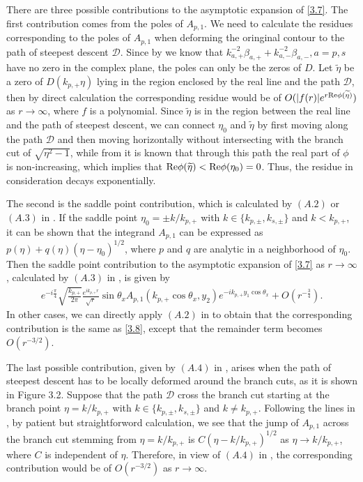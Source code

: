 \documentclass[final,reqno]{siamltex}
\newcommand{\Rt}{{\rm Re}}
\newcommand{\wid}{\widetilde}
\newcommand{\be}{\begin{eqnarray}}
\newcommand{\en}{\end{eqnarray}}
\begin{document}
There are three possible contributions to the asymptotic expansion of \eqref{3.7}. The first contribution comes from the poles of $A_{p,1}$. We need to calculate the residues corresponding to the poles of $A_{p,1}$ when deforming the oringinal contour to the path of steepest descent $\mathcal{D}$. Since by \cite[Section 2.3.4]{CP17} we know that $k_{a,+}^{-2}\beta_{a,+}+k_{a,-}^{-2}\beta_{a,-},a=p,s$ have no zero in the complex plane, the poles can only be the zeros of $D$. Let $\wid\eta$ be a zero of $D(k_{p,+}\eta)$ lying in the region enclosed by the real line and the path $\mathcal{D}$, then by direct calculation the corresponding residue would be of $O(|f(r)|e^{r\Rt\phi(\wid\eta)})$ as $r\rightarrow\infty$, where $f$ is a polynomial. Since $\wid\eta$ is in the region between the real line and the path of steepest descent, we can connect $\eta_0$ and $\wid\eta$ by first moving along the path $\mathcal{D}$ and then moving horizontally without intersecting with the branch cut of $\sqrt{\eta^2-1}$, while from \cite[Section 7.2]{NB84} it is known that through this path the real part of $\phi$ is non-increasing, which implies that $\Rt\phi(\wid\eta)<\Rt\phi(\eta_0)=0$. Thus, the residue in consideration decays exponentially. 

The second is the saddle point contribution, which is calculated by $(A.2)$ or $(A.3)$ in \cite{CP17}. If the saddle point $\eta_0=\pm k/k_{p,+}$ with $k\in\{k_{p,\pm},k_{s,\pm}\}$ and $k<k_{p,+}$, it can be shown that the integrand $A_{p,1}$ can be expressed as $p(\eta)+q(\eta)(\eta-\eta_0)^{1/2}$, where $p$ and $q$ are analytic in a neighborhood of $\eta_0$. Then the saddle point contribution to the asymptotic expansion of \eqref{3.7} as $r\rightarrow\infty$, calculated by $(A.3)$ in \cite{CP17}, is given by 
\be\label{3.8}
  e^{-i\frac{\pi}{4}}\sqrt{\frac{k_{p,+}}{2\pi}}\frac{e^{ik_{p,+}r}}{\sqrt{r}}\sin\theta_xA_{p,1}(k_{p,+}\cos\theta_x,y_2)e^{-ik_{p,+}y_1\cos\theta_x}+O\left(r^{-\frac{3}{4}}\right). 
\en
In other cases, we can directly apply $(A.2)$ in \cite{CP17} to obtain that the corresponding contribution is the same as \eqref{3.8}, except that the remainder term becomes $O(r^{-3/2})$. 

The last possible contribution, given by $(A.4)$ in \cite{CP17}, arises when the path of steepest descent has to be locally deformed around the branch cuts, as it is shown in Figure 3.2. Suppose that the path $\mathcal{D}$ cross the branch cut starting at the branch point $\eta=k/k_{p,+}$ with $k\in\{k_{p,\pm},k_{s,\pm}\}$ and $k\neq k_{p,+}$. Following the lines in \cite[Section 2.3.4]{CP17}, by patient but straightforword calculation, we see that the jump of $A_{p,1}$ across the branch cut stemming from $\eta=k/k_{p,+}$ is $C(\eta-k/k_{p,+})^{1/2}$ as $\eta\rightarrow k/k_{p,+}$, where $C$ is independent of $\eta$. Therefore, in view of $(A.4)$ in \cite{CP17}, the corresponding contribution would be of $O(r^{-3/2})$ as $r\rightarrow\infty$. 
\end{document}
